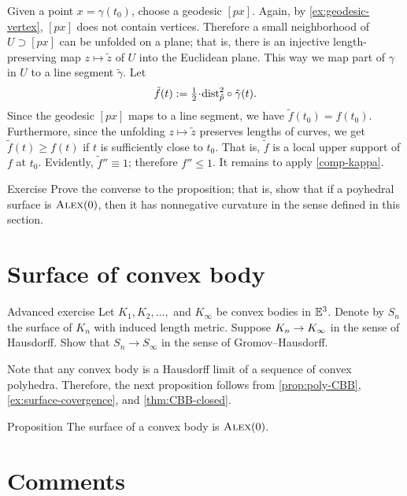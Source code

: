 Given a point $x=\gamma(t_0)$, choose a geodesic $[px]$.
Again, by \ref{ex:geodesic-vertex}, $[px]$ does not contain vertices.
Therefore a small neighborhood of $U\supset [px]$ can be unfolded on a plane;
that is, there is an injective length-preserving map $z\mapsto \tilde z$
of $U$ into the Euclidean plane.
This way we map part of $\gamma$ in $U$ to a line segment $\tilde\gamma$.
Let 
\[\tilde f(t)\df\tfrac12\cdot\distfun_{\tilde p}^2\circ\tilde \gamma(t).\]
Since the geodesic $[px]$ maps to a line segment, we have $\tilde f(t_0)= f(t_0)$.
Furthermore, since the unfolding $z\mapsto \tilde z$ preserves lengths of curves, we get 
$\tilde f(t)\ge f(t)$ if $t$ is sufficiently close to $t_0$.
That is, $\tilde f$ is a local upper support of $f$ at $t_0$.
Evidently, $\tilde f''\equiv 1$; therefore $f''\le 1$.
It remains to apply \ref{comp-kappa}.
\qeds

\begin{thm}{Exercise}\label{ex:poly-CBB}
Prove the converse to the proposition;
that is, show that if a poyhedral surface is $\textsc{Alex}(0)$, then it has nonnegative curvature in the sense defined in this section.
\end{thm}

\section{Surface of convex body}

\begin{thm}{Advanced exercise}\label{ex:surface-covergence}
Let $K_1,K_2,\dots,$ and $K_\infty$ be convex bodies in $\mathbb{E}^3$.
Denote by $S_n$ the surface of $K_n$ with induced length metric.
Suppose $K_n\z\to K_\infty$ in the sense of Hausdorff.
Show that $S_n\to S_\infty$ in the sense of Gromov--Hausdorff.
\end{thm}

Note that any convex body is a Hausdorff limit of a sequence of convex polyhedra.
Therefore, the next proposition follows from \ref{prop:poly-CBB}, \ref{ex:surface-covergence}, and \ref{thm:CBB-closed}.

\begin{thm}{Proposition}\label{prop:conv-surf-CBB(0)}
The surface of a convex body is $\textsc{Alex}(0)$.
\end{thm}


\section{Comments}

